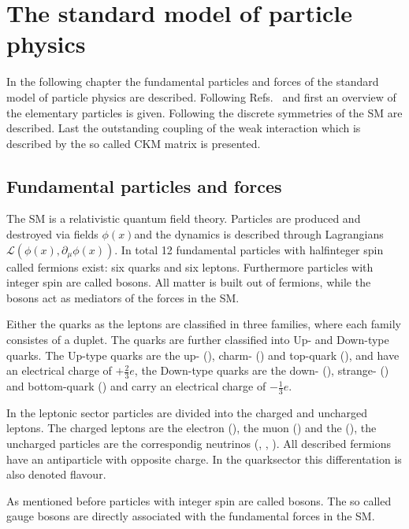 \chapter{The standard model of particle physics}

In the following chapter the fundamental particles and forces of the standard model of particle physics are described.
Following Refs.~\cite{SM_1} and \cite{SM_2} first an overview of the elementary particles is given. Following the discrete
symmetries of the \ac{SM} are described. Last the outstanding coupling of the weak interaction which is described by the so
called CKM matrix is presented.

\section{Fundamental particles and forces}

The \ac{SM} is a relativistic quantum field theory. Particles are produced and destroyed via fields $\phi(x)$and the dynamics
is described through Lagrangians $\mathcal{L}\left(\phi(x),\partial_{\mu}\phi(x)\right)$. In total 12 fundamental particles
with halfinteger spin called fermions exist: six quarks and six leptons. Furthermore particles with integer spin are called
bosons. All matter is built out of fermions, while the bosons act as mediators of the forces in the \ac{SM}.

Either the quarks as the leptons are classified in three families, where each family consistes of a duplet. The quarks are further
classified into Up- and Down-type quarks. The Up-type quarks are the up- (\uquark), charm- (\cquark) and top-quark (\tquark), and have
an electrical charge of $+\frac{2}{3}e$, the Down-type quarks are the down- (\dquark), strange- (\squark) and bottom-quark (\bquark) and carry an
electrical charge of $-\frac{1}{3}e$.

In the leptonic sector particles are divided into the charged and uncharged leptons. The charged leptons are the electron (\electron),
the muon (\muon) and the \tauon (\tauon), the uncharged particles are the correspondig neutrinos (\neue, \neum, \neut). All described
fermions have an antiparticle with opposite charge. In the quarksector this differentation is also denoted  flavour.

As mentioned before particles with integer spin are called bosons. The so called gauge bosons are directly associated with the fundamental
forces in the \ac{SM}.

